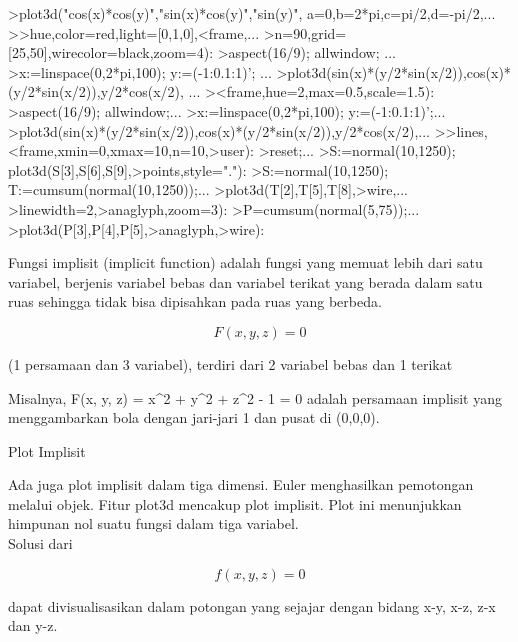 \documentclass[a4paper,10pt]{article}
\begin{document}
\begin{eulernotebook}
\begin{eulercomment}
\begin{eulercomment}
\begin{eulercomment}
\end{eulercomment}
\begin{eulerprompt}
>plot3d("cos(x)*cos(y)","sin(x)*cos(y)","sin(y)", a=0,b=2*pi,c=pi/2,d=-pi/2,...
>>hue,color=red,light=[0,1,0],<frame,...
>n=90,grid=[25,50],wirecolor=black,zoom=4):
>aspect(16/9); allwindow; ...
>x:=linspace(0,2*pi,100); y:=(-1:0.1:1)'; ...
>plot3d(sin(x)*(y/2*sin(x/2)),cos(x)*(y/2*sin(x/2)),y/2*cos(x/2), ...
><frame,hue=2,max=0.5,scale=1.5):
>aspect(16/9); allwindow;...
>x:=linspace(0,2*pi,100); y:=(-1:0.1:1)';...
>plot3d(sin(x)*(y/2*sin(x/2)),cos(x)*(y/2*sin(x/2)),y/2*cos(x/2),...
>>lines,<frame,xmin=0,xmax=10,n=10,>user):
>reset;...
>S:=normal(10,1250); plot3d(S[3],S[6],S[9],>points,style="."):
>S:=normal(10,1250); T:=cumsum(normal(10,1250));...
>plot3d(T[2],T[5],T[8],>wire,...
>linewidth=2,>anaglyph,zoom=3):
>P=cumsum(normal(5,75));...
>plot3d(P[3],P[4],P[5],>anaglyph,>wire):
\end{eulerprompt}
\begin{eulercomment}
Fungsi implisit (implicit function) adalah fungsi yang memuat lebih
dari satu variabel, berjenis variabel bebas dan variabel terikat yang
berada dalam satu ruas sehingga tidak bisa dipisahkan pada ruas yang
berbeda.

\end{eulercomment}
\begin{eulerformula}
\[
F(x,y,z)=0
\]
\end{eulerformula}
\begin{eulercomment}
(1 persamaan dan 3 variabel), terdiri dari 2 variabel bebas dan 1
terikat

Misalnya, F(x, y, z) = x\textasciicircum{}2 + y\textasciicircum{}2 + z\textasciicircum{}2 - 1 = 0 adalah persamaan
implisit yang menggambarkan bola dengan jari-jari 1 dan pusat di
(0,0,0).

Plot Implisit

Ada juga plot implisit dalam tiga dimensi. Euler menghasilkan
pemotongan melalui objek. Fitur plot3d mencakup plot implisit. Plot
ini menunjukkan himpunan nol suatu fungsi dalam tiga variabel.\\
Solusi dari



\end{eulercomment}
\begin{eulerformula}
\[
f(x,y,z) = 0
\]
\end{eulerformula}
\begin{eulercomment}
dapat divisualisasikan dalam potongan yang sejajar dengan bidang x-y,
x-z, z-x dan y-z.


\end{eulercomment}
\end{eulercomment}
\end{eulercomment}
\end{eulernotebook}
\end{document}
